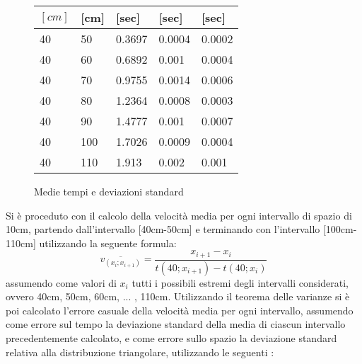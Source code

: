 \documentclass[a4paper,11pt,oneside]{article}
\begin{document}
\begin{figure}[h!]
{\begin{tabular}{m{0.7cm}m{0.7cm}|m{1.0cm}m{1.0cm}m{1.0cm}}
        $[\si{cm}]$&[cm]&[sec]&[sec]&[sec]\\
        \midrule
        40 & 50  & 0.3697  & 0.0004 & 0.0002 \\
        40 & 60  & 0.6892 & 0.001  & 0.0004 \\
        40 & 70  & 0.9755 & 0.0014  & 0.0006 \\
        40 & 80  & 1.2364 & 0.0008 & 0.0003 \\
        40 & 90  & 1.4777 & 0.001  & 0.0007 \\
        40 & 100 & 1.7026 & 0.0009 & 0.0004 \\
        40 & 110 & 1.913 & 0.002  & 0.001 \\
        \bottomrule
    \end{tabular}
    \hspace{0.7cm}
    }
    \newline
    \caption{Medie tempi e deviazioni standard}
\end{figure}


Si è proceduto con il calcolo della velocità media per ogni intervallo di spazio di 10cm, partendo dall'intervallo [40cm-50cm] e terminando con l'intervallo [100cm-110cm] utilizzando la seguente formula:
\begin{equation*}
    \overline{v_{(x_i;x_{i+1})}}=\frac{x_{i+1}-x_i}{t(40;x_{i+1})-t(40;x_i)}
\end{equation*}
assumendo come valori di $x_i$ tutti i possibili estremi degli intervalli considerati, ovvero 40cm, 50cm, 60cm, ... , 110cm.
\newpage
Utilizzando il teorema delle varianze si è poi calcolato l'errore casuale della velocità media per ogni intervallo, assumendo come errore sul tempo la deviazione standard della media di ciascun intervallo precedentemente calcolato, e come errore sullo spazio la deviazione standard relativa alla distribuzione triangolare, utilizzando le seguenti :
\end{document}
